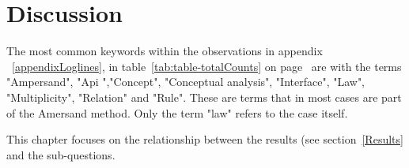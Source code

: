 \newpage
\section{Discussion} \label{Discussion}

\begin{comment}
the discussion, in which you connect the results to the research questions and the literature

aanpak log verwerking:
- totaliseren van de results
- actie research: wat ben ik aan het doen
- experimenteren in de praktijk
- deel uitmaken van het proces
- laten gebeuren
- valt me op dat .... -> content analyse
- cluster waarneming -> beschouwen: het valt me op dat .. en onderbouwing
- bottom up (logs) en top down (gesprekken)
- bij elk log -> wie wat waar; traceerbaar houden







TODO


=======
- iemand moet het nalezen op consistentie
- nalezen op vorm
- checken of de referenties nog kloppen


- hoe ga je straks om met wijzigingen in de wet. 
- Vanuit de wet weet je straks wat de wijzingen zijn, maar ga je deze ook in scripts terugvinden.



H5 -> observaties kritisch  bekijken -> welke zaken komen vaak voor
\end{comment}
The most common keywords within the observations in appendix ~\ref{appendixLoglines}, in table~\ref{tab:table-totalCounts} on page~\pageref{tab:table-totalCounts} are with the terms "Ampersand", "Api ","Concept", "Conceptual analysis",
"Interface", "Law", "Multiplicity", "Relation" and "Rule".
These are terms that in most cases are part of the Amersand method.
Only the term "law" refers to the case itself.

This chapter focuses on the relationship between the results (see section~\ref{Results} and the sub-questions.

